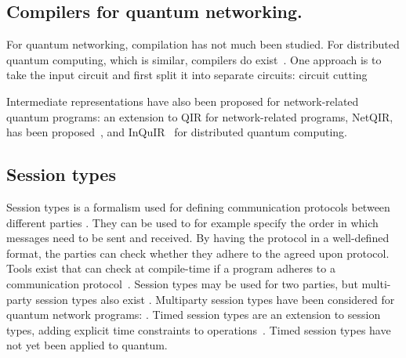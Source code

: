




\subsection{Compilers for quantum networking.}
For quantum networking, compilation has not much been studied.
For distributed quantum computing, which is similar, compilers do exist~\cite{ferrari_compiler_2021, chatterjee_qurzon_2022, cuomo_optimized_2023, ferrari_modular_2023}.
One approach is to take the input circuit and first split it into separate circuits: circuit cutting~\cite{chatterjee_qurzon_2022}

Intermediate representations have also been proposed for network-related quantum programs:
an extension to QIR for network-related programs, NetQIR, has been proposed~\cite{vazquez-perez_netqir_2024}, and InQuIR~\cite{nishio_inquir_2023} for distributed quantum computing.


\subsection{Session types}
\label{compiler:sec:session-types}

Session types is a formalism used for defining communication protocols between different parties \cite{honda_language_1998}.
They can be used to for example specify the order in which messages need to be sent and received.
By having the protocol in a well-defined format, the parties can check whether they adhere to the agreed upon protocol.
Tools exist that can check at compile-time if a program adheres to a communication protocol~\cite{davidson_model_nodate, ardeshir-larijani_automated_2018}.
Session types may be used for two parties, but multi-party session types also exist \cite{honda_multiparty_2016}.
Multiparty session types have been considered for quantum network programs: \cite{lanese_towards_2024}.
Timed session types are an extension to session types, adding explicit time constraints to operations~\cite{bartoletti_timed_2017}.
Timed session types have not yet been applied to quantum.


